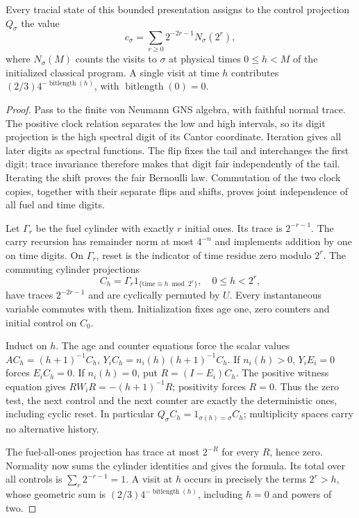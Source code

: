 \begin{lemma}\label{lem:control-traces}
Every tracial state of this bounded presentation assigns to the control projection $Q_\sigma$ the value
\[
 c_\sigma=\sum_{r\ge0}2^{-2r-1}N_\sigma(2^r),
\]
where $N_\sigma(M)$ counts the visits to $\sigma$ at physical times $0\le h<M$ of the initialized classical program. A single visit at time $h$ contributes $(2/3)4^{-\operatorname{bitlength}(h)}$, with $\operatorname{bitlength}(0)=0$.
\end{lemma}
\begin{proof}
Pass to the finite von Neumann GNS algebra, with faithful normal trace. The positive clock relation separates the low and high intervals, so its digit projection is the high spectral digit of its Cantor coordinate. Iteration gives all later digits as spectral functions. The flip fixes the tail and interchanges the first digit; trace invariance therefore makes that digit fair independently of the tail. Iterating the shift proves the fair Bernoulli law. Commutation of the two clock copies, together with their separate flips and shifts, proves joint independence of all fuel and time digits.

Let $\Gamma_r$ be the fuel cylinder with exactly $r$ initial ones. Its trace is $2^{-r-1}$. The carry recursion has remainder norm at most $4^{-n}$ and implements addition by one on time digits. On $\Gamma_r$, reset is the indicator of time residue zero modulo $2^r$. The commuting cylinder projections
\[
 C_h=\Gamma_r1_{\{\text{time}\equiv h\bmod2^r\}},\quad 0\le h<2^r,
\]
have traces $2^{-2r-1}$ and are cyclically permuted by $U$. Every instantaneous variable commutes with them. Initialization fixes age one, zero counters and initial control on $C_0$.

Induct on $h$. The age and counter equations force the scalar values $A C_h=(h+1)^{-1}C_h$, $Y_iC_h=n_i(h)(h+1)^{-1}C_h$. If $n_i(h)>0$, $Y_iE_i=0$ forces $E_iC_h=0$. If $n_i(h)=0$, put $R=(I-E_i)C_h$. The positive witness equation gives $RW_iR=-(h+1)^{-1}R$; positivity forces $R=0$. Thus the zero test, the next control and the next counter are exactly the deterministic ones, including cyclic reset. In particular $Q_\sigma C_h=1_{\sigma(h)=\sigma}C_h$; multiplicity spaces carry no alternative history.

The fuel-all-ones projection has trace at most $2^{-R}$ for every $R$, hence zero. Normality now sums the cylinder identities and gives the formula. Its total over all controls is $\sum_r2^{-r-1}=1$. A visit at $h$ occurs in precisely the terms $2^r>h$, whose geometric sum is $(2/3)4^{-\operatorname{bitlength}(h)}$, including $h=0$ and powers of two.
\end{proof}

